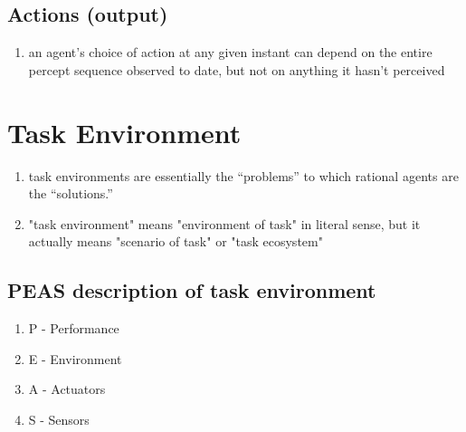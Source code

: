 \subsection{Actions (output)}

\begin{enumerate}
    \item an agent’s choice of action at any given instant can depend on the entire percept sequence observed to date, but not on anything it hasn’t perceived
\end{enumerate}



\section{Task Environment}

\begin{enumerate}
    \item task environments are essentially the “problems” to which rational agents are the “solutions.”

    \item "task environment" means "environment of task" in literal sense, but it actually means "scenario of task" or "task ecosystem"
\end{enumerate}

\subsection{PEAS description of task environment}
\begin{enumerate}
    \item P - Performance
    \item E - Environment
    \item A - Actuators
    \item S - Sensors
\end{enumerate}

